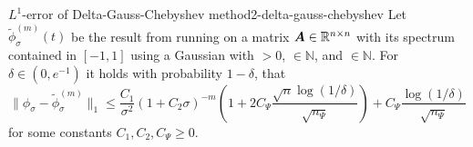 \begin{theorem}{$L^1$-error of Delta-Gauss-Chebyshev method}{2-delta-gauss-chebyshev}
    Let $\widetilde{\phi}_{\sigma}^{(m)}(t)$ be the result from running 
    on a matrix $\boldsymbol{A} \in \mathbb{R}^{n \times n}$ with its spectrum contained in $[-1, 1]$ using
    a Gaussian  with
     $>0$,  $\in \mathbb{N}$, and
     $\in \mathbb{N}$. For $\delta \in (0, e^{-1})$ it holds with
    probability $1-\delta$, that
    \begin{equation}
        \lVert \phi_{\sigma} - \widetilde{\phi}_{\sigma}^{(m)}\rVert _1
        \leq \frac{C_1}{\sigma^2} (1 + C_2 \sigma)^{-m} \left( 1 + 2 C_{\Psi} \frac{\sqrt{n} \log(1/\delta)}{\sqrt{n_{\Psi}}} \right) + C_{\Psi} \frac{\log(1/\delta)}{\sqrt{n_{\Psi}}}
    \end{equation}
    for some constants $C_1, C_2, C_{\Psi} \geq 0$.
\end{theorem}


